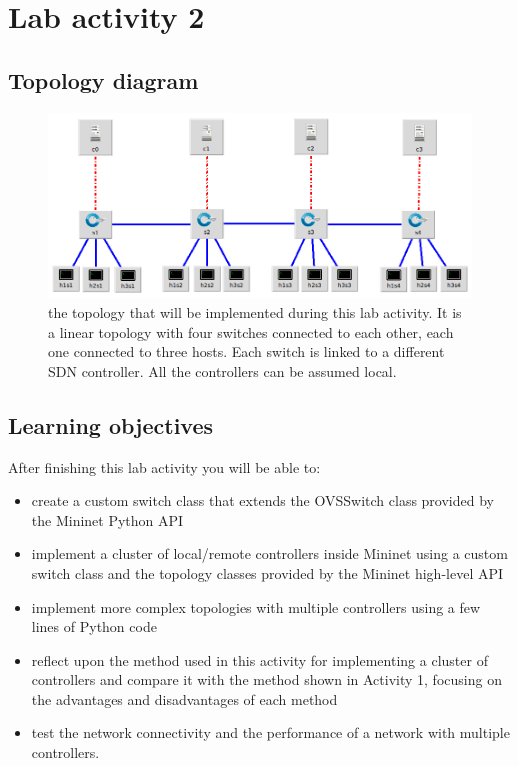 
\section*{Lab activity 2}

\subsection*{Topology diagram}
\begin{figure}[htb]
	\centering
	\includegraphics[width=1\linewidth]{img/topology-2.png}
	\caption{the topology that will be implemented during this lab activity.
  It is a linear topology with four switches connected to each other,
  each one connected to three hosts. Each switch is linked to a different
  SDN controller. All the controllers can be assumed local.}
	\label{fig:topology-2}
\end{figure}

\subsection*{Learning objectives}
After finishing this lab activity you will be able to:
\begin{itemize}
  \item create a custom switch class that extends the OVSSwitch class provided
  by the Mininet Python API
  \item implement a cluster of local/remote controllers inside Mininet using a custom
  switch class and the topology classes provided by the Mininet high-level API
  \item implement more complex topologies with multiple controllers using a
  few lines of Python code
  \item reflect upon the method used in this activity for implementing a cluster of controllers
  and compare it with the method shown in Activity 1, focusing on the advantages
  and disadvantages of each method
  \item test the network connectivity and the performance of a network with multiple
  controllers.
\end{itemize}






